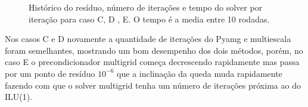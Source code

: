 \begin{figure}[]
\center
{}


\qquad
{}

\caption{ Histórico do resíduo, número de iterações e tempo do solver por iteração para caso C, D , E. O tempo é a media entre 10 rodadas. }

\label{fig:resultadosCDE}
\end{figure}

Nos casos C e D novamente a quantidade de iterações do Pyamg e multiescala foram semelhantes, mostrando um bom desempenho dos dois métodos, porém, no caso E o precondicionador multigrid começa decrescendo rapidamente mas passa por um ponto de resíduo $10^{-6}$ que a inclinação da queda muda rapidamente fazendo com que o solver multigrid tenha um número de iterações próxima ao do ILU(1). 


